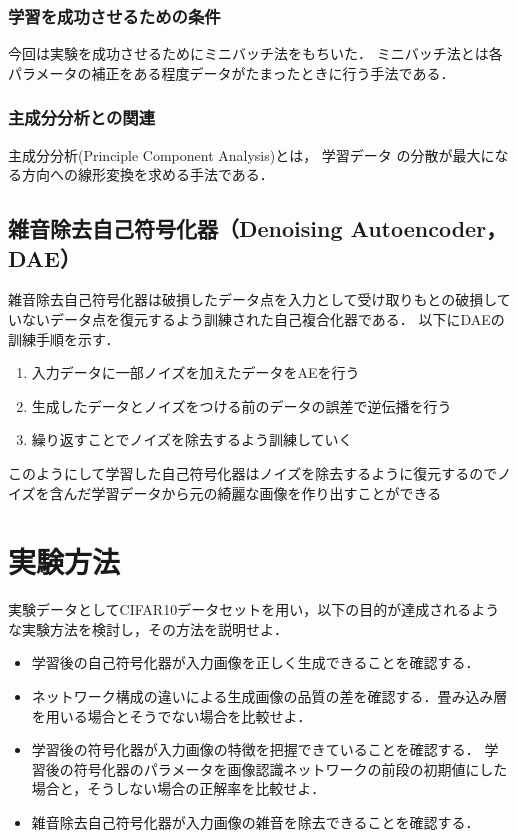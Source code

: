 \documentclass[12pt]{jsarticle}
\begin{document}
\subsubsection{学習を成功させるための条件}
今回は実験を成功させるためにミニバッチ法をもちいた．
ミニバッチ法とは各パラメータの補正をある程度データがたまったときに行う手法である．

\subsubsection{主成分分析との関連}
主成分分析(Principle Component Analysis)とは，
学習データ
の分散が最大になる方向への線形変換を求める手法である．




\subsection{雑音除去自己符号化器（Denoising Autoencoder，DAE）}

雑音除去自己符号化器は破損したデータ点を入力として受け取りもとの破損していないデータ点を復元するよう訓練された自己複合化器である．
以下にDAEの訓練手順を示す．
\begin{enumerate}
  \item 入力データに一部ノイズを加えたデータをAEを行う
  \item 生成したデータとノイズをつける前のデータの誤差で逆伝播を行う
  \item 繰り返すことでノイズを除去するよう訓練していく
\end{enumerate}

このようにして学習した自己符号化器はノイズを除去するように復元するのでノイズを含んだ学習データから元の綺麗な画像を作り出すことができる

\section{実験方法}

実験データとしてCIFAR10データセットを用い，以下の目的が達成されるような実験方法を検討し，その方法を説明せよ．

\begin{itemize}
\item 学習後の自己符号化器が入力画像を正しく生成できることを確認する．
\item ネットワーク構成の違いによる生成画像の品質の差を確認する．畳み込み層を用いる場合とそうでない場合を比較せよ．
\item 学習後の符号化器が入力画像の特徴を把握できていることを確認する．
学習後の符号化器のパラメータを画像認識ネットワークの前段の初期値にした場合と，そうしない場合の正解率を比較せよ．
\item 雑音除去自己符号化器が入力画像の雑音を除去できることを確認する．
\end{itemize}
\end{document}
